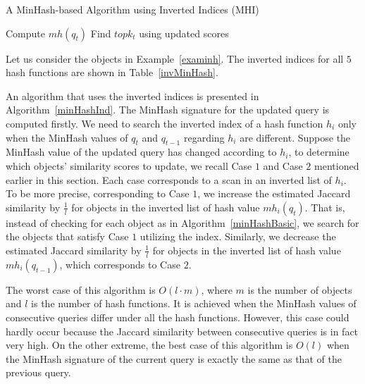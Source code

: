 \begin{algorithm2e}[thb]
 \SetAlgoLined
 \caption{A MinHash-based Algorithm using Inverted Indices (MHI)} 
\label{minHashInd}
 Compute $mh(q_{t})$\;
 Find $topk_{t}$ using updated scores\;
\end{algorithm2e}

\begin{example}  \label{indexMinHash} 
Let us consider the objects in Example~\ref{examinh}. The inverted indices for all $5$ hash functions are shown in Table~\ref{invMinHash}.       
\end{example}


An algorithm that uses the inverted indices is presented in Algorithm~\ref{minHashInd}. The MinHash signature for the updated query is computed firstly. We need to search the inverted index of a hash function $h_i$ only when the MinHash values of $q_t$ and $q_{t-1}$ regarding $h_i$ are different. Suppose the MinHash value of the updated query has changed according to $h_i$, to determine which objects' similarity scores to update, we recall Case $1$ and Case $2$ mentioned earlier in this section. Each case corresponds to a scan in an inverted list of $h_i$. To be more precise, corresponding to Case $1$, we increase the estimated Jaccard similarity by $\frac{1}{l}$ for objects in the inverted list of hash value $mh_i(q_{t})$. That is, instead of checking for each object as in Algorithm~\ref{minHashBasic}, we search for the objects that satisfy Case $1$ utilizing the index. Similarly, we decrease the estimated Jaccard similarity by $\frac{1}{l}$ for objects in the inverted list of hash value $mh_i(q_{t-1})$, which corresponds to Case $2$. 

The worst case of this algorithm is $O(l\cdot m)$, where $m$ is the number of objects and $l$ is the number of hash functions. It is achieved when the MinHash values of consecutive queries differ under all the hash functions. However, this case could hardly occur because the Jaccard similarity between consecutive queries is in fact very high. On the other extreme, the best case of this algorithm is $O(l)$ when the MinHash signature of the current query is exactly the same as that of the previous query.  

